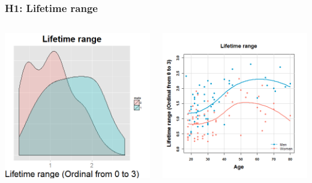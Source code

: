 \documentclass{beamer}
\begin{document}
\begin{frame}
\frametitle{H1: Lifetime range}

\begin{columns}
\begin{column}{.5\textwidth}
\includegraphics[width= 1\textwidth]{mobltm_sex}
\end{column}

\begin{column}{.5\textwidth}
\includegraphics[width= 1.1\textwidth]{ltage}
\end{column}

\end{columns}

\end{frame}
\end{document}
